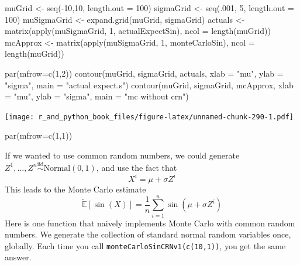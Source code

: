 \documentclass[
  12pt,
  krantz2]{krantz}
\makeatletter
\newenvironment{Shaded}{\begin{snugshade}}{\end{snugshade}}
\newcommand{\AttributeTok}[1]{\textcolor[rgb]{0.61,0.61,0.61}{#1}}
\newcommand{\DecValTok}[1]{\textcolor[rgb]{0.06,0.06,0.06}{#1}}
\newcommand{\FunctionTok}[1]{\textcolor[rgb]{0,0,0}{#1}}
\newcommand{\NormalTok}[1]{#1}
\newcommand{\OtherTok}[1]{\textcolor[rgb]{0.37,0.37,0.37}{#1}}
\newcommand{\SpecialCharTok}[1]{\textcolor[rgb]{0,0,0}{#1}}
\newcommand{\StringTok}[1]{\textcolor[rgb]{0.5,0.5,0.5}{#1}}
\newenvironment{kframe}{%
\medskip{}
\setlength{\fboxsep}{.8em}
 \def\at@end@of@kframe{}%
 \ifinner\ifhmode%
  \def\at@end@of@kframe{\end{minipage}}%
  \begin{minipage}{\columnwidth}%
 \fi\fi%
 \def\FrameCommand##1{\hskip\@totalleftmargin \hskip-\fboxsep
 \colorbox{shadecolor}{##1}\hskip-\fboxsep
     \hskip-\linewidth \hskip-\@totalleftmargin \hskip\columnwidth}%
 \MakeFramed {\advance\hsize-\width
   \@totalleftmargin\z@ \linewidth\hsize
   \@setminipage}}%
 {\par\unskip\endMakeFramed%
 \at@end@of@kframe}
\renewenvironment{Shaded}{\begin{kframe}}{\end{kframe}}
\makeatother
\begin{document}
\begin{Shaded}
\begin{Highlighting}[]
\NormalTok{muGrid }\OtherTok{\textless{}{-}} \FunctionTok{seq}\NormalTok{(}\SpecialCharTok{{-}}\DecValTok{10}\NormalTok{,}\DecValTok{10}\NormalTok{, }\AttributeTok{length.out =} \DecValTok{100}\NormalTok{)}
\NormalTok{sigmaGrid }\OtherTok{\textless{}{-}} \FunctionTok{seq}\NormalTok{(.}\DecValTok{001}\NormalTok{, }\DecValTok{5}\NormalTok{, }\AttributeTok{length.out =} \DecValTok{100}\NormalTok{)}
\NormalTok{muSigmaGrid }\OtherTok{\textless{}{-}} \FunctionTok{expand.grid}\NormalTok{(muGrid, sigmaGrid)}
\NormalTok{actuals }\OtherTok{\textless{}{-}}  \FunctionTok{matrix}\NormalTok{(}\FunctionTok{apply}\NormalTok{(muSigmaGrid, }\DecValTok{1}\NormalTok{, actualExpectSin), }\AttributeTok{ncol =} \FunctionTok{length}\NormalTok{(muGrid))}
\NormalTok{mcApprox }\OtherTok{\textless{}{-}} \FunctionTok{matrix}\NormalTok{(}\FunctionTok{apply}\NormalTok{(muSigmaGrid, }\DecValTok{1}\NormalTok{, monteCarloSin), }\AttributeTok{ncol =} \FunctionTok{length}\NormalTok{(muGrid))}

\FunctionTok{par}\NormalTok{(}\AttributeTok{mfrow=}\FunctionTok{c}\NormalTok{(}\DecValTok{1}\NormalTok{,}\DecValTok{2}\NormalTok{))}
\FunctionTok{contour}\NormalTok{(muGrid, sigmaGrid, actuals, }\AttributeTok{xlab =} \StringTok{"mu"}\NormalTok{, }\AttributeTok{ylab =} \StringTok{"sigma"}\NormalTok{, }\AttributeTok{main =} \StringTok{"actual expect.s"}\NormalTok{)}
\FunctionTok{contour}\NormalTok{(muGrid, sigmaGrid, mcApprox, }\AttributeTok{xlab =} \StringTok{"mu"}\NormalTok{, }\AttributeTok{ylab =} \StringTok{"sigma"}\NormalTok{, }\AttributeTok{main =} \StringTok{"mc without crn"}\NormalTok{)}
\end{Highlighting}
\end{Shaded}

\texttt{[image: r\_and\_python\_book\_files/figure-latex/unnamed-chunk-290-1.pdf]}

\begin{Shaded}
\begin{Highlighting}[]
\FunctionTok{par}\NormalTok{(}\AttributeTok{mfrow=}\FunctionTok{c}\NormalTok{(}\DecValTok{1}\NormalTok{,}\DecValTok{1}\NormalTok{))}
\end{Highlighting}
\end{Shaded}

If we wanted to use common random numbers, we could generate \(Z^1, \ldots, Z^n \overset{\text{iid}}{\sim} \text{Normal}(0, 1)\), and use the fact that
\[
X^i = \mu + \sigma Z^i
\]
This leads to the Monte Carlo estimate
\[
\tilde{\mathbb{E}}[\sin(X)] = \frac{1}{n}\sum_{i=1}^n\sin(\mu + \sigma Z^i)
\]
Here is one function that naively implements Monte Carlo with common random numbers. We generate the collection of standard normal random variables once, globally. Each time you call \texttt{monteCarloSinCRNv1(c(10,1))}, you get the same answer.
\end{document}
